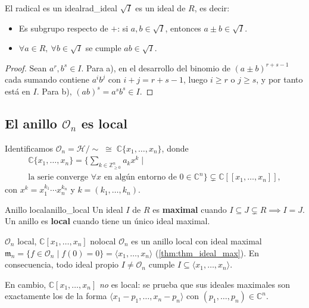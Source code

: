 \documentclass[11pt,a4paper]{article}
\begin{document}
\begin{proposicion}{El radical es un ideal}{rad_ideal}
$\sqrt{I}$ es un ideal de $R$, es decir:
\begin{itemize}
    \item[a)] Es subgrupo respecto de $+$: si $a, b \in \sqrt{I}$, entonces $a \pm b \in \sqrt{I}$.
    \item[b)] $\forall a \in R,\ \forall b \in \sqrt{I}$ se cumple $ab \in \sqrt{I}$.
\end{itemize}
\end{proposicion}
\begin{proof}
Sean $a^r, b^s \in I$. Para a), en el desarrollo del binomio de $(a \pm b)^{r+s-1}$ cada sumando contiene $a^i b^j$ con $i+j = r+s-1$, luego $i \ge r$ o $j \ge s$, y por tanto está en $I$. Para b), $(ab)^s = a^s b^s \in I$.
\end{proof}

\subsection*{El anillo $\mathcal{O}_n$ es local}

Identificamos $\mathcal{O}_n = \mathcal{H}/{\sim} \;\cong\; \mathbb{C}\{x_1, \dots, x_n\}$, donde
\begin{multline*} \mathbb{C}\{x_1,\dots,x_n\} = \Big\{ \sum_{k \in \mathbb{Z}_{\ge 0}^n} a_k x^k \;\Big|\; \\ \text{la serie converge } \forall x \text{ en algún entorno de } 0 \in \mathbb{C}^n \Big\} \subsetneq \mathbb{C}[[x_1,\dots,x_n]], \end{multline*}
con $x^k = x_1^{k_1} \cdots x_n^{k_n}$ y $k = (k_1, \dots, k_n)$.

\begin{definicion}{Anillo local}{anillo_local}
Un ideal $I$ de $R$ es \textbf{maximal} cuando $I \subseteq J \subsetneq R \implies I = J$. Un anillo es \textbf{local} cuando tiene un único ideal maximal.
\end{definicion}

\begin{observacion}{$\mathcal{O}_n$ local, $\mathbb{C}[x_1,\dots,x_n]$ no}{local}
$\mathcal{O}_n$ es un anillo local con ideal maximal $\mathfrak{m}_n = \{ f \in \mathcal{O}_n \mid f(0) = 0 \} = \langle x_1, \dots, x_n \rangle$ (\cref{thm:thm_ideal_max}). En consecuencia, todo ideal propio $I \neq \mathcal{O}_n$ cumple $I \subseteq \langle x_1, \dots, x_n \rangle$.

En cambio, $\mathbb{C}[x_1,\dots,x_n]$ \emph{no} es local: se prueba que sus ideales maximales son exactamente los de la forma $\langle x_1 - p_1, \dots, x_n - p_n \rangle$ con $(p_1, \dots, p_n) \in \mathbb{C}^n$.
\end{observacion}
\end{document}
